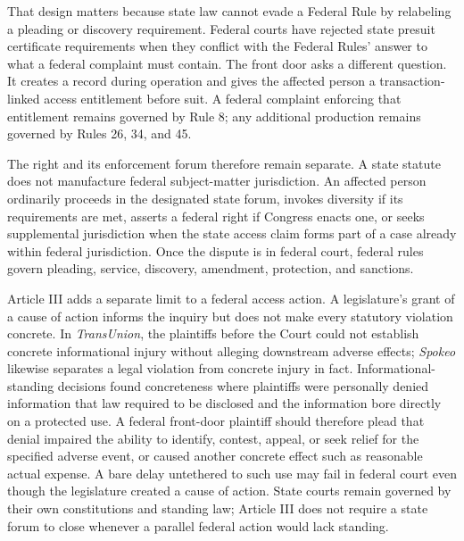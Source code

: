That design matters because state law cannot evade a Federal Rule by relabeling a pleading or discovery requirement. Federal courts have rejected state presuit certificate requirements when they conflict with the Federal Rules' answer to what a federal complaint must contain. The front door asks a different question. It creates a record during operation and gives the affected person a transaction-linked access entitlement before suit. A federal complaint enforcing that entitlement remains governed by Rule 8; any additional production remains governed by Rules 26, 34, and 45.

The right and its enforcement forum therefore remain separate. A state statute does not manufacture federal subject-matter jurisdiction. An affected person ordinarily proceeds in the designated state forum, invokes diversity if its requirements are met, asserts a federal right if Congress enacts one, or seeks supplemental jurisdiction when the state access claim forms part of a case already within federal jurisdiction. Once the dispute is in federal court, federal rules govern pleading, service, discovery, amendment, protection, and sanctions.

Article III adds a separate limit to a federal access action. A legislature's grant of a cause of action informs the inquiry but does not make every statutory violation concrete. In \emph{TransUnion}, the plaintiffs before the Court could not establish concrete informational injury without alleging downstream adverse effects; \emph{Spokeo} likewise separates a legal violation from concrete injury in fact. Informational-standing decisions found concreteness where plaintiffs were personally denied information that law required to be disclosed and the information bore directly on a protected use. A federal front-door plaintiff should therefore plead that denial impaired the ability to identify, contest, appeal, or seek relief for the specified adverse event, or caused another concrete effect such as reasonable actual expense. A bare delay untethered to such use may fail in federal court even though the legislature created a cause of action. State courts remain governed by their own constitutions and standing law; Article III does not require a state forum to close whenever a parallel federal action would lack standing.

